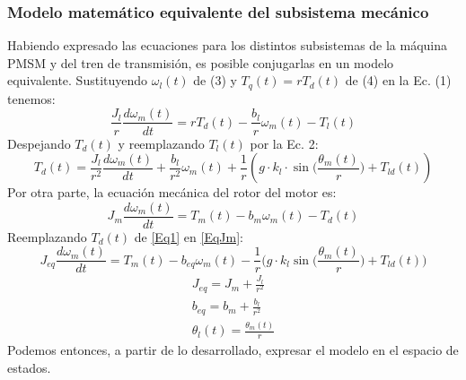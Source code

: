 \documentclass[12pt, a4paper,journal, onecolumn, compsoc]{IEEEtran}
\begin{document}
    \subsubsection{Modelo matemático equivalente del subsistema mecánico}
    Habiendo expresado las ecuaciones para los distintos subsistemas de la máquina PMSM y del tren de transmisión, es posible conjugarlas en un modelo equivalente.
    Sustituyendo \(\omega_l(t)\) de (3) y \(T_q(t) = rT_d(t)\) de (4) en la Ec. (1) tenemos:
    \begin{equation}\label{EqAux1}
        \frac{J_l}{r}\frac{d\omega_m(t)}{dt} = rT_d(t)-\frac{b_l}{r}\omega_m(t)-T_l(t)
    \end{equation}
    Despejando \(T_d(t)\) y reemplazando \(T_l(t)\) por la Ec. 2:
    \begin{equation}\label{Eq1}
        T_d(t)=\frac{J_l}{r^2}\frac{d\omega_m(t)}{dt}+\frac{b_l}{r^2}\omega_m(t)+\frac{1}{r}\left(g\cdot k_l\cdot \sin\Big(\frac{\theta_m(t)}{r}\Big)+T_{ld}(t)\right)
    \end{equation}
    Por otra parte, la ecuación mecánica del rotor del motor es:
    \begin{equation}\label{EqJm}
        J_m\frac{d\omega_m(t)}{dt}=T_m(t)-b_m\omega_m(t)-T_d(t)
    \end{equation}
    Reemplazando \(T_d(t)\) de \eqref{Eq1} en  \eqref{EqJm}:
    \begin{equation}
        J_{eq}\frac{d\omega_m(t)}{dt}=T_m(t)-b_{eq}\omega_m(t)-\frac{1}{r}\Big(g\cdot k_l \sin{\Big(\frac{\theta_m(t)}{r}\Big)} + T_{ld}(t)\Big)
    \end{equation}
    \begin{gather}
        J_{eq} = J_m +\frac{J_l}{r^2}\\
        b_{eq} = b_m + \frac{b_l}{r^2}\\
        \theta_l(t)=\frac{\theta_m(t)}{r}
    \end{gather}
    Podemos entonces, a partir de lo desarrollado, expresar el modelo en el espacio de estados.
\end{document}
